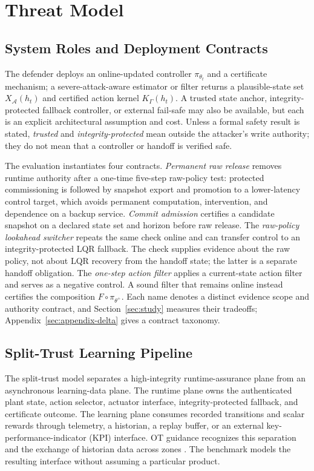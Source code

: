 \section{Threat Model}
\label{sec:threat}

\subsection{System Roles and Deployment Contracts}

The defender deploys an online-updated controller $\pi_{\theta_t}$ and a
certificate mechanism; a severe-attack-aware estimator or filter returns a
plausible-state set $X_{\mathcal A}(h_t)$ and certified action kernel
$K_\Gamma(h_t)$.  A trusted state anchor, integrity-protected fallback
controller, or external fail-safe may also be available, but each is an explicit architectural
assumption and cost.
Unless a formal safety result is stated, \emph{trusted} and
\emph{integrity-protected} mean outside the attacker's write authority; they do
not mean that a controller or handoff is verified safe.

The evaluation instantiates four contracts.  \emph{Permanent raw release}
removes runtime authority after a one-time five-step raw-policy test: protected
commissioning is followed by snapshot export and promotion to a lower-latency
control target, which avoids permanent computation, intervention, and
dependence on a backup service.  \emph{Commit admission} certifies a candidate
snapshot on a declared state set and horizon before raw release.
The \emph{raw-policy lookahead switcher} repeats the same check online and can
transfer control to an integrity-protected LQR fallback.  The check supplies
evidence about the raw policy, not about LQR recovery from the handoff state;
the latter is a separate handoff obligation.  The \emph{one-step action
filter} applies a current-state action filter and serves as a negative
control.  A sound filter that remains online instead certifies the composition
$F\circ\pi_{\theta^+}$.  Each name denotes a distinct evidence scope and
authority contract, and Section~\ref{sec:study} measures their tradeoffs;
Appendix~\ref{sec:appendix-delta} gives a contract taxonomy.

\subsection{Split-Trust Learning Pipeline}

The split-trust model separates a high-integrity runtime-assurance plane
from an asynchronous learning-data plane.  The runtime plane owns the
authenticated plant state, action selector, actuator interface,
integrity-protected fallback, and certificate outcome.  The learning plane consumes recorded
transitions and scalar rewards through telemetry, a historian, a replay
buffer, or an external key-performance-indicator (KPI) interface.  OT guidance
recognizes this separation and the exchange of historian data across zones
\cite{nist_ot_security_2023,mitre_data_historian}.  The benchmark models the
resulting interface without assuming a particular product.

